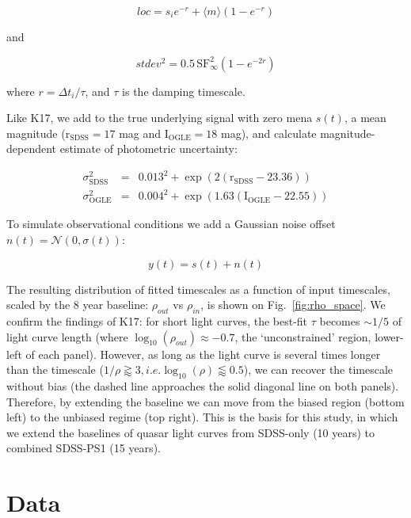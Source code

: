\documentclass[twocolumn]{aastex62}
\begin{document}
\begin{equation}
loc = s_{i} e ^ { - r  }  + \langle m \rangle \left( 1 - e ^{ - r }\right)
\end{equation}

and 

\begin{equation}
stdev^{2} =  0.5  \, \mathrm{SF}_{\infty}^{2} \left( 1 - e ^{  - 2 r  }  \right)
\end{equation}

where  $r = \Delta t_{i} / \tau$, and $\tau$ is the damping timescale.


Like K17, we add to the true underlying signal with zero mena $s(t)$, a mean magnitude  ($\mathrm{r_{SDSS}}=17$ mag and $\mathrm{I_{OGLE}}=18$ mag), and calculate magnitude-dependent estimate of photometric uncertainty:

\begin{eqnarray}
\sigma_{\mathrm{SDSS}}^{2} &=& 0.013^{2} + \exp{(2 (\mathrm{r_{SDSS}}-23.36))} \\
\sigma_{\mathrm{OGLE}}^{2} &=& 0.004^{2} + \exp{(1.63 (\mathrm{I_{OGLE}} - 22.55))}
\end{eqnarray}

To simulate observational conditions  we add a Gaussian noise offset $n(t) = \mathcal{N}(0,\sigma(t))$:

\begin{equation}
y(t) = s(t) + n(t) 
\end{equation}

The resulting distribution of fitted timescales  as a function of input timescales, scaled by the  8 year baseline: $\rho_{out}$ vs $\rho_{in}$, is shown on Fig.~\ref{fig:rho_space}. We confirm the findings of K17: for short light curves, the best-fit $\tau$ becomes $\sim 1/5$ of light curve length (where $\log_{10}{(\rho_{out})} \approx -0.7$, the `unconstrained' region, lower-left of each panel). However, as long as the light curve is several times longer than the timescale ($1/\rho \gtrapprox 3, i.e. \log_{10}{(\rho)} \lessapprox 0.5$), we can recover the timescale without bias (the dashed line approaches the solid diagonal line on both panels). Therefore, by extending the baseline we can move from the biased region (bottom left) to the unbiased regime (top right). This is the basis for this study,  in which we extend the baselines of quasar light curves from SDSS-only (10 years) to combined SDSS-PS1 (15 years). 


%
%
%
%
\section{Data}
\label{sec:data}
\end{document}
